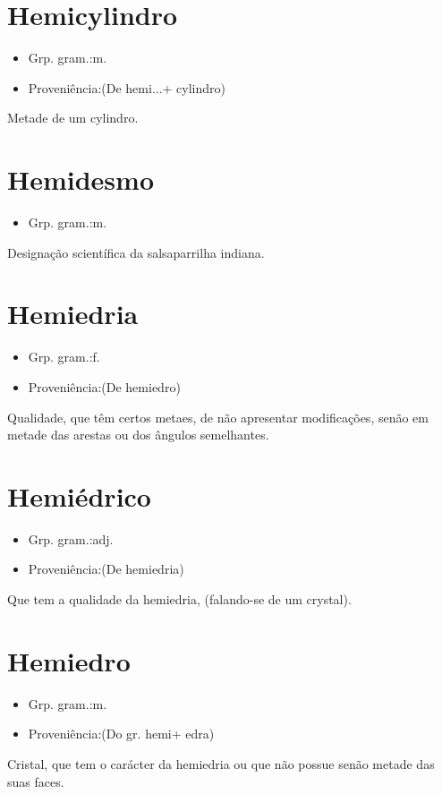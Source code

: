 \documentclass{article}
\begin{document}
\section{Hemicylindro}
\begin{itemize}
\item {Grp. gram.:m.}
\end{itemize}
\begin{itemize}
\item {Proveniência:(De \textunderscore hemi...\textunderscore  + \textunderscore cylindro\textunderscore )}
\end{itemize}
Metade de um cylindro.
\section{Hemidesmo}
\begin{itemize}
\item {Grp. gram.:m.}
\end{itemize}
Designação scientífica da salsaparrilha indiana.
\section{Hemiedria}
\begin{itemize}
\item {Grp. gram.:f.}
\end{itemize}
\begin{itemize}
\item {Proveniência:(De \textunderscore hemiedro\textunderscore )}
\end{itemize}
Qualidade, que têm certos metaes, de não apresentar modificações, senão em metade das arestas ou dos ângulos semelhantes.
\section{Hemiédrico}
\begin{itemize}
\item {Grp. gram.:adj.}
\end{itemize}
\begin{itemize}
\item {Proveniência:(De \textunderscore hemiedria\textunderscore )}
\end{itemize}
Que tem a qualidade da hemiedria, (falando-se de um crystal).
\section{Hemiedro}
\begin{itemize}
\item {Grp. gram.:m.}
\end{itemize}
\begin{itemize}
\item {Proveniência:(Do gr. \textunderscore hemi\textunderscore  + \textunderscore edra\textunderscore )}
\end{itemize}
Cristal, que tem o carácter da hemiedria ou que não possue senão metade das suas faces.
\end{document}
